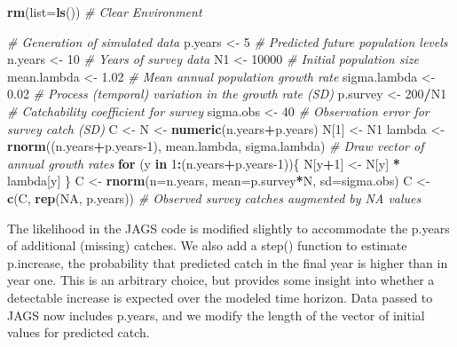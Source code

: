 \documentclass[
]{krantz}
\makeatletter
\newenvironment{Shaded}{\begin{snugshade}}{\end{snugshade}}
\newcommand{\AttributeTok}[1]{\textcolor[rgb]{0.27,0.27,0.27}{#1}}
\newcommand{\CommentTok}[1]{\textcolor[rgb]{0.37,0.37,0.37}{\textit{#1}}}
\newcommand{\ConstantTok}[1]{\textcolor[rgb]{0.37,0.37,0.37}{#1}}
\newcommand{\ControlFlowTok}[1]{\textcolor[rgb]{0.27,0.27,0.27}{\textbf{#1}}}
\newcommand{\DecValTok}[1]{\textcolor[rgb]{0.06,0.06,0.06}{#1}}
\newcommand{\FloatTok}[1]{\textcolor[rgb]{0.06,0.06,0.06}{#1}}
\newcommand{\FunctionTok}[1]{\textcolor[rgb]{0.27,0.27,0.27}{\textbf{#1}}}
\newcommand{\NormalTok}[1]{#1}
\newcommand{\OtherTok}[1]{\textcolor[rgb]{0.37,0.37,0.37}{#1}}
\newcommand{\SpecialCharTok}[1]{\textcolor[rgb]{0.43,0.43,0.43}{\textbf{#1}}}
\newenvironment{kframe}{%
\medskip{}
\setlength{\fboxsep}{.8em}
 \def\at@end@of@kframe{}%
 \ifinner\ifhmode%
  \def\at@end@of@kframe{\end{minipage}}%
  \begin{minipage}{\columnwidth}%
 \fi\fi%
 \def\FrameCommand##1{\hskip\@totalleftmargin \hskip-\fboxsep
 \colorbox{shadecolor}{##1}\hskip-\fboxsep
     \hskip-\linewidth \hskip-\@totalleftmargin \hskip\columnwidth}%
 \MakeFramed {\advance\hsize-\width
   \@totalleftmargin\z@ \linewidth\hsize
   \@setminipage}}%
 {\par\unskip\endMakeFramed%
 \at@end@of@kframe}
\renewenvironment{Shaded}{\begin{kframe}}{\end{kframe}}
\makeatother
\begin{document}
\begin{Shaded}
\begin{Highlighting}[]
\FunctionTok{rm}\NormalTok{(}\AttributeTok{list=}\FunctionTok{ls}\NormalTok{()) }\CommentTok{\# Clear Environment}

\CommentTok{\# Generation of simulated data}
\NormalTok{p.years }\OtherTok{\textless{}{-}} \DecValTok{5} \CommentTok{\# Predicted future population levels}
\NormalTok{n.years }\OtherTok{\textless{}{-}} \DecValTok{10} \CommentTok{\# Years of survey data}
\NormalTok{N1 }\OtherTok{\textless{}{-}} \DecValTok{10000}  \CommentTok{\# Initial population size}
\NormalTok{mean.lambda }\OtherTok{\textless{}{-}} \FloatTok{1.02} \CommentTok{\# Mean annual population growth rate}
\NormalTok{sigma.lambda }\OtherTok{\textless{}{-}} \FloatTok{0.02} \CommentTok{\# Process (temporal) variation in the growth rate (SD)}
\NormalTok{p.survey }\OtherTok{\textless{}{-}} \DecValTok{200}\SpecialCharTok{/}\NormalTok{N1 }\CommentTok{\# Catchability coefficient for survey}
\NormalTok{sigma.obs }\OtherTok{\textless{}{-}} \DecValTok{40} \CommentTok{\# Observation error for survey catch (SD)}
\NormalTok{C }\OtherTok{\textless{}{-}}\NormalTok{ N }\OtherTok{\textless{}{-}} \FunctionTok{numeric}\NormalTok{(n.years}\SpecialCharTok{+}\NormalTok{p.years)}
\NormalTok{N[}\DecValTok{1}\NormalTok{] }\OtherTok{\textless{}{-}}\NormalTok{ N1}
\NormalTok{lambda }\OtherTok{\textless{}{-}} \FunctionTok{rnorm}\NormalTok{((n.years}\SpecialCharTok{+}\NormalTok{p.years}\DecValTok{{-}1}\NormalTok{), mean.lambda, sigma.lambda) }\CommentTok{\# Draw vector of annual growth rates}
\ControlFlowTok{for}\NormalTok{ (y }\ControlFlowTok{in} \DecValTok{1}\SpecialCharTok{:}\NormalTok{(n.years}\SpecialCharTok{+}\NormalTok{p.years}\DecValTok{{-}1}\NormalTok{))\{}
\NormalTok{  N[y}\SpecialCharTok{+}\DecValTok{1}\NormalTok{] }\OtherTok{\textless{}{-}}\NormalTok{ N[y] }\SpecialCharTok{*}\NormalTok{ lambda[y]}
\NormalTok{\}}
\NormalTok{C }\OtherTok{\textless{}{-}} \FunctionTok{rnorm}\NormalTok{(}\AttributeTok{n=}\NormalTok{n.years, }\AttributeTok{mean=}\NormalTok{p.survey}\SpecialCharTok{*}\NormalTok{N, }\AttributeTok{sd=}\NormalTok{sigma.obs)}
\NormalTok{C }\OtherTok{\textless{}{-}} \FunctionTok{c}\NormalTok{(C, }\FunctionTok{rep}\NormalTok{(}\ConstantTok{NA}\NormalTok{, p.years))  }\CommentTok{\# Observed survey catches augmented by NA values}
\end{Highlighting}
\end{Shaded}

The likelihood in the JAGS code is modified slightly to accommodate the p.years of additional (missing) catches. We also add a step() function to estimate p.increase, the probability that predicted catch in the final year is higher than in year one. This is an arbitrary choice, but provides some insight into whether a detectable increase is expected over the modeled time horizon. Data passed to JAGS now includes p.years, and we modify the length of the vector of initial values for predicted catch.
\end{document}
